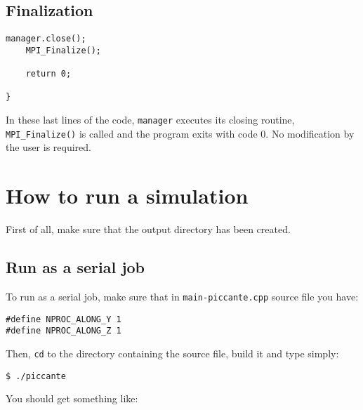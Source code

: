 \documentclass[11pt,a4paper]{report}
\begin{document}
\section{Finalization}
\begin{lstlisting}[backgroundcolor=\color{no_modify}]
	manager.close();
	MPI_Finalize();
	
	return 0;

}
\end{lstlisting}
In these last lines of the code, \verb+manager+ executes its closing routine, \verb+MPI_Finalize()+ is called and the program exits with code 0. No modification by the user is required.



\chapter{How to run a simulation}\label{chapter_run}
First of all, make sure that the output directory has been created.
\section{Run as a serial job}
To run as a serial job, make sure that in \verb+main-piccante.cpp+ source file you have:
\begin{lstlisting}
#define NPROC_ALONG_Y 1
#define NPROC_ALONG_Z 1
\end{lstlisting}
Then, \verb+cd+ to the directory containing the source file, build it and type simply:
\begin{verbatim}
$ ./piccante
\end{verbatim}
You should get something like:
\end{document}
